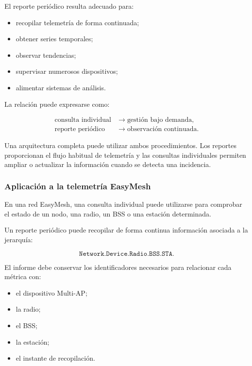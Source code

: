 El reporte periódico resulta adecuado para:

\begin{itemize}
    \item recopilar telemetría de forma continuada;
    \item obtener series temporales;
    \item observar tendencias;
    \item supervisar numerosos dispositivos;
    \item alimentar sistemas de análisis.
\end{itemize}

La relación puede expresarse como:

\[
\begin{aligned}
    \text{consulta individual}
    &\longrightarrow
    \text{gestión bajo demanda},\\
    \text{reporte periódico}
    &\longrightarrow
    \text{observación continuada}.
\end{aligned}
\]

Una arquitectura completa puede utilizar ambos procedimientos. Los
reportes proporcionan el flujo habitual de telemetría y las consultas
individuales permiten ampliar o actualizar la información cuando se
detecta una incidencia.


\subsubsection*{Aplicación a la telemetría EasyMesh}

En una red EasyMesh, una consulta individual puede utilizarse para
comprobar el estado de un nodo, una radio, un BSS o una estación
determinada.

Un reporte periódico puede recopilar de forma continua información
asociada a la jerarquía:

\[
    \texttt{Network.Device.Radio.BSS.STA}.
\]

El informe debe conservar los identificadores necesarios para relacionar
cada métrica con:

\begin{itemize}
    \item el dispositivo Multi-AP;
    \item la radio;
    \item el BSS;
    \item la estación;
    \item el instante de recopilación.
\end{itemize}

